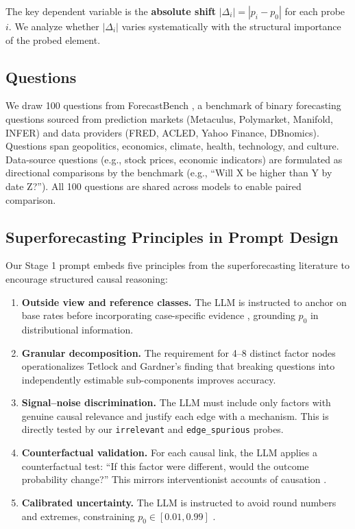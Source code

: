 \documentclass[11pt]{article}
\begin{document}
The key dependent variable is the \textbf{absolute shift} $|\Delta_i| = |p_i - p_0|$ for each probe $i$. We analyze whether $|\Delta_i|$ varies systematically with the structural importance of the probed element.

\subsection{Questions}

We draw 100 questions from ForecastBench \cite{zou2024forecastbench}, a benchmark of binary forecasting questions sourced from prediction markets (Metaculus, Polymarket, Manifold, INFER) and data providers (FRED, ACLED, Yahoo Finance, DBnomics). Questions span geopolitics, economics, climate, health, technology, and culture. Data-source questions (e.g., stock prices, economic indicators) are formulated as directional comparisons by the benchmark (e.g., ``Will X be higher than Y by date Z?''). All 100 questions are shared across models to enable paired comparison.

\subsection{Superforecasting Principles in Prompt Design}
\label{sec:superforecasting}

Our Stage 1 prompt embeds five principles from the superforecasting literature \cite{tetlock2015superforecasting} to encourage structured causal reasoning:

\begin{enumerate}
    \item \textbf{Outside view and reference classes.} The LLM is instructed to anchor on base rates before incorporating case-specific evidence \cite{kahneman2011thinking}, grounding $p_0$ in distributional information.

    \item \textbf{Granular decomposition.} The requirement for 4--8 distinct factor nodes operationalizes Tetlock and Gardner's finding that breaking questions into independently estimable sub-components improves accuracy.

    \item \textbf{Signal--noise discrimination.} The LLM must include only factors with genuine causal relevance and justify each edge with a mechanism. This is directly tested by our \texttt{irrelevant} and \texttt{edge\_spurious} probes.

    \item \textbf{Counterfactual validation.} For each causal link, the LLM applies a counterfactual test: ``If this factor were different, would the outcome probability change?'' This mirrors interventionist accounts of causation \cite{woodward2005making}.

    \item \textbf{Calibrated uncertainty.} The LLM is instructed to avoid round numbers and extremes, constraining $p_0 \in [0.01, 0.99]$ \cite{baron2014heuristics}.
\end{enumerate}
\end{document}
